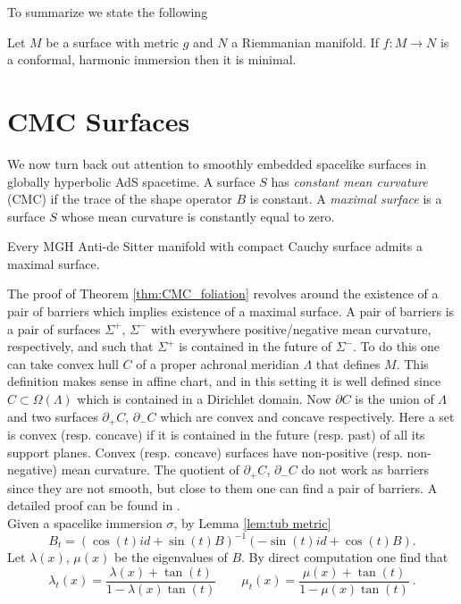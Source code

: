 To summarize we state the following
\begin{theorem}\label{thm:minimal}
    Let $M$ be a surface with metric $g$ and $N$ a Riemmanian manifold. If $f: M \to N$ is a conformal, harmonic immersion then it is minimal.
\end{theorem}

\section{CMC Surfaces}
We now turn back out attention to smoothly embedded spacelike surfaces in globally hyperbolic AdS spacetime. A surface $S$ has \textit{constant mean curvature} (CMC) if the trace of the shape operator $B$ is constant. A \textit{maximal surface} is a surface $S$ whose mean curvature is constantly equal to zero.
\begin{theorem}\label{thm:CMC_foliation}
    Every MGH Anti-de Sitter manifold with compact Cauchy surface admits a maximal surface.
\end{theorem}
The proof of Theorem \ref{thm:CMC_foliation} revolves around the existence of a pair of barriers which implies existence of a maximal surface. A pair of barriers is a pair of surfaces $\Sigma^+$, $\Sigma^-$ with everywhere positive/negative mean curvature, respectively, and such that $\Sigma^+$ is contained in the future of $\Sigma^-$.
To do this one can take convex hull $C$ of a proper achronal meridian $\Lambda$ that defines $M$. This definition makes sense in affine chart, and in this setting it is well defined since $C \subset \Omega(\Lambda)$ which is contained in a Dirichlet domain. Now $\partial C$ is the union of $\Lambda$ and two surfaces $\partial_+ C$, $\partial_- C$ which are convex and concave respectively. Here a set is convex (resp. concave) if it is contained in the future (resp. past) of all its support planes. Convex (resp. concave) surfaces have non-positive (resp. non-negative) mean curvature. The quotient of $\partial_+ C$, $\partial_- C$ do not work as barriers since they are not smooth, but close to them one can find a pair of barriers.
A detailed proof can be found in \cite{barbot2004constant}.\\
Given a spacelike immersion $\sigma$, by Lemma \ref{lem:tub metric}
\[
    B_t = (\cos(t) id + \sin(t) B)^{-1}(-\sin(t) id + \cos(t) B).
\]
Let $\lambda(x)$, $\mu(x)$ be the eigenvalues of $B$. By direct computation one find that
\begin{equation} \label{eq:eigenvalues}
    \lambda_t(x) = \frac{\lambda(x)+\tan(t)}{1- \lambda(x)\tan(t)} \qquad \mu_t(x) = \frac{\mu(x)+\tan(t)}{1- \mu(x)\tan(t)} \ .
\end{equation}
